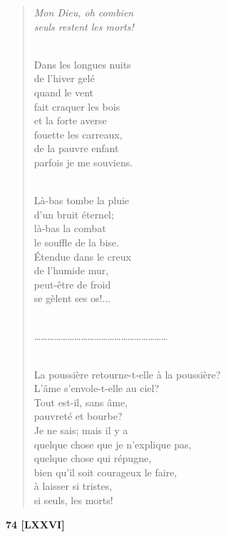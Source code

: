 \documentclass[a4paper,12pt]{book}
\begin{document}
\begin{verse}
{\em Mon Dieu, oh combien \\
seuls restent les morts!} \\ \

Dans les longues nuits \\
de l'hiver gelé \\
quand le vent \\
fait craquer les bois \\
et la forte averse \\
fouette les carreaux, \\
de la pauvre enfant \\
parfois je me souviens. \\ \

Là-bas tombe la pluie \\
d'un bruit éternel; \\
là-bas la combat \\
le souffle de la bise. \\
Étendue dans le creux \\
de l'humide mur, \\
peut-être de froid \\
se gèlent ses os!... \\ \

\ldots\ldots\ldots\ldots\ldots\ldots\ldots\ldots\ldots\ldots\ldots\ldots\ldots\ldots\ldots\ldots\ldots\ldots\ldots\ldots \\ \

La poussière retourne-t-elle à la poussière? \\
L'âme s'envole-t-elle au ciel? \\
Tout est-il, sans âme, \\
pauvreté et bourbe? \\
Je ne sais; mais il y a \\
quelque chose que je n'explique pas, \\
quelque chose qui répugne, \\
bien qu'il soit courageux le faire, \\
à laisser si tristes, \\
si seuls, les morts! \\
\end{verse}

\bigskip

\begin{center} {\bf 74 [LXXVI]} \end{center}
\end{document}

